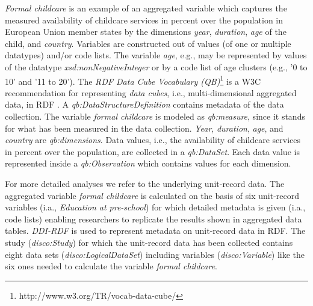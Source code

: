 \documentclass{llncs}
\newcommand{\ke}[1]{\todo[size=\small, color=orange!40]{\textbf{Kai:} #1}}
\newcommand{\tb}[1]{\todo[size=\small, color=green!40]{\textbf{Thomas:} #1}}
\begin{document}
\emph{Formal childcare} is an example of an aggregated variable which captures the measured availability of childcare services in percent over the population in European Union member states by 
the dimensions \emph{year}, \emph{duration}, \emph{age} of the child, and \emph{country}.
Variables are constructed out of values (of one or multiple datatypes) and/or code lists.
The variable \emph{age}, e.g., may be represented by values of the datatype \emph{xsd:nonNegativeInteger} or by a code list of age clusters (e.g., '0 to 10' and '11 to 20'). 
The \emph{RDF Data Cube Vocabulary (QB)}\footnote{http://www.w3.org/TR/vocab-data-cube/} is a W3C recommendation for representing \emph{data cubes}, i.e., multi-dimensional aggregated data, in RDF \cite{Cyganiak2010}. 
A \emph{qb:DataStructureDefinition} contains metadata of the data collection.
The variable \emph{formal childcare} is modeled as \emph{qb:measure}, since it stands for what has been measured in the data collection.
\emph{Year}, \emph{duration}, \emph{age}, and \emph{country} are \emph{qb:dimensions}.
Data values, i.e., the availability of childcare services in percent over the population, are collected in a \emph{qb:DataSet}. 
Each data value is represented inside a \emph{qb:Observation} which contains values for each dimension. 

For more detailed analyses we refer to the underlying unit-record data. The aggregated variable \emph{formal childcare} is calculated on the basis of six unit-record variables (i.a., \emph{Education at pre-school}) for which detailed metadata is given (i.a., code lists) enabling researchers to replicate the results shown in aggregated data tables.
\emph{DDI-RDF} is used to represent metadata on unit-record data in RDF.
The study (\emph{disco:Study}) for which the unit-record data has been collected 
contains eight data sets (\emph{disco:LogicalDataSet})
including variables (\emph{disco:Variable}) like the six ones needed to calculate the variable \emph{formal childcare}.
\end{document}
